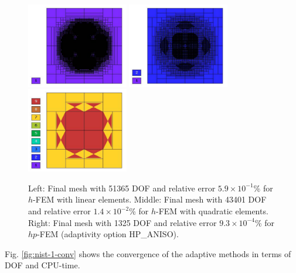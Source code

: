 \documentclass[12pt]{elsarticle}
\begin{document}
\begin{figure}[!ht]
\centering
\includegraphics[height=3.7cm]{mafig2.pdf}
\includegraphics[height=3.7cm]{mafig3.pdf}
\includegraphics[height=3.7cm]{mafig4.pdf}
\caption{
Left: Final mesh with 51365 DOF and relative error $5.9\times10^{-1}$\% for $h$-FEM with linear elements.
Middle: Final mesh with 43401 DOF and relative error $1.4\times10^{-2}$\% for $h$-FEM with quadratic elements.
Right: Final mesh with 1325 DOF and relative error $9.3\times10^{-4}$\% for $hp$-FEM (adaptivity option HP\_ANISO).}
\label{fig:nist-1-hp-aniso}
\end{figure}

Fig. \ref{fig:nist-1-conv} shows the convergence of the adaptive methods in terms of DOF and CPU-time.
\end{document}

